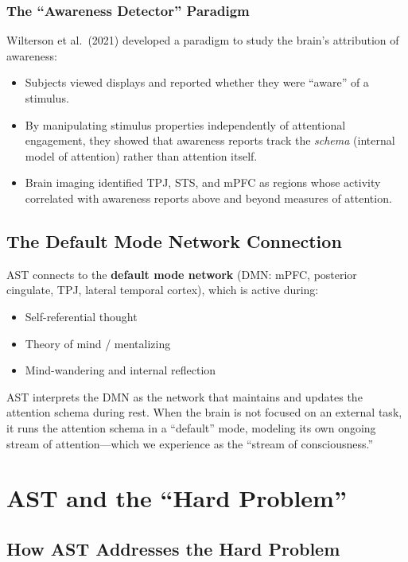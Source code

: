 \documentclass[11pt,a4paper]{report}
\begin{document}
\subsection{The ``Awareness Detector'' Paradigm}

Wilterson et al.\ (2021) developed a paradigm to study the brain's attribution of awareness:
\begin{itemize}[leftmargin=1.5em]
  \item Subjects viewed displays and reported whether they were ``aware'' of a stimulus.
  \item By manipulating stimulus properties independently of attentional engagement, they showed that awareness reports track the \emph{schema} (internal model of attention) rather than attention itself.
  \item Brain imaging identified TPJ, STS, and mPFC as regions whose activity correlated with awareness reports above and beyond measures of attention.
\end{itemize}

\section{The Default Mode Network Connection}

AST connects to the \textbf{default mode network} (DMN: mPFC, posterior cingulate, TPJ, lateral temporal cortex), which is active during:
\begin{itemize}[leftmargin=1.5em]
  \item Self-referential thought
  \item Theory of mind / mentalizing
  \item Mind-wandering and internal reflection
\end{itemize}

AST interprets the DMN as the network that maintains and updates the attention schema during rest. When the brain is not focused on an external task, it runs the attention schema in a ``default'' mode, modeling its own ongoing stream of attention---which we experience as the ``stream of consciousness.''


\chapter{AST and the ``Hard Problem''}

\section{How AST Addresses the Hard Problem}
\end{document}
